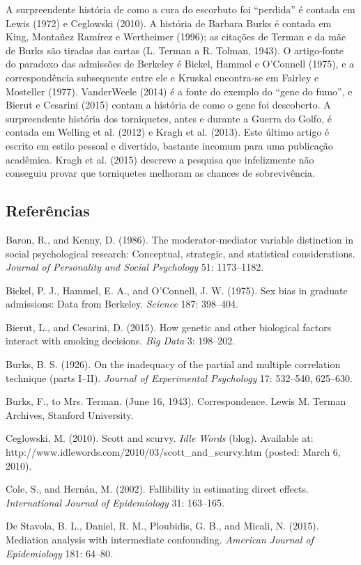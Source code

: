 \documentclass[11pt,a5paper,twoside]{book}
\begin{document}
A surpreendente história de como a cura do escorbuto foi “perdida” é contada em Lewis (1972) e Ceglowski (2010). A história de Barbara Burks é contada em King, Montañez Ramírez e Wertheimer (1996); as citações de Terman e da mãe de Burks são tiradas das cartas (L. Terman a R. Tolman, 1943). O artigo-fonte do paradoxo das admissões de Berkeley é Bickel, Hammel e O’Connell (1975), e a correspondência subsequente entre ele e Kruskal encontra-se em Fairley e Mosteller (1977). VanderWeele (2014) é a fonte do exemplo do “gene do fumo”, e Bierut e Cesarini (2015) contam a história de como o gene foi descoberto. A surpreendente história dos torniquetes, antes e durante a Guerra do Golfo, é contada em Welling et al. (2012) e Kragh et al. (2013). Este último artigo é escrito em estilo pessoal e divertido, bastante incomum para uma publicação acadêmica. Kragh et al. (2015) descreve a pesquisa que infelizmente não conseguiu provar que torniquetes melhoram as chances de sobrevivência.

\subsection{Referências}
Baron, R., and Kenny, D. (1986). The moderator-mediator variable distinction in social psychological research: Conceptual, strategic, and statistical considerations. \textit{Journal of Personality and Social Psychology} 51: 1173–1182.

Bickel, P. J., Hammel, E. A., and O’Connell, J. W. (1975). Sex bias in graduate admissions: Data from Berkeley. \textit{Science} 187: 398–404.

Bierut, L., and Cesarini, D. (2015). How genetic and other biological factors interact with smoking decisions. \textit{Big Data} 3: 198–202.

Burks, B. S. (1926). On the inadequacy of the partial and multiple correlation technique (parts I–II). \textit{Journal of Experimental Psychology} 17: 532–540, 625–630.

Burks, F., to Mrs. Terman. (June 16, 1943). Correspondence. Lewis M. Terman Archives, Stanford University.

Ceglowski, M. (2010). Scott and scurvy. \textit{Idle Words} (blog). Available at: http://www.idlewords.com/2010/03/scott\_and\_scurvy.htm (posted: March 6, 2010).

Cole, S., and Hernán, M. (2002). Fallibility in estimating direct effects. \textit{International Journal of Epidemiology} 31: 163–165.

De Stavola, B. L., Daniel, R. M., Ploubidis, G. B., and Micali, N. (2015). Mediation analysis with intermediate confounding. \textit{American Journal of Epidemiology} 181: 64–80.
\end{document}
